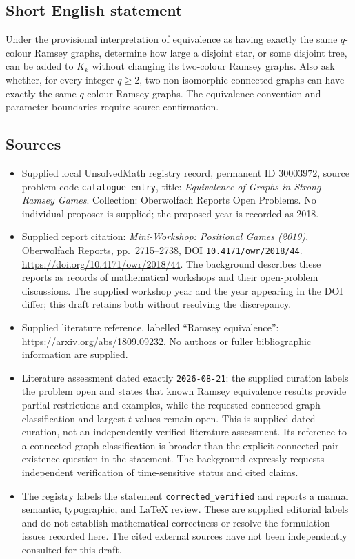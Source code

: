 \documentclass[11pt]{article}
\begin{document}
\subsection{Short English statement}
Under the provisional interpretation of equivalence as having exactly the same \(q\)-colour Ramsey graphs, determine how large a disjoint star, or some disjoint tree, can be added to \(K_k\) without changing its two-colour Ramsey graphs. Also ask whether, for every integer \(q\ge2\), two non-isomorphic connected graphs can have exactly the same \(q\)-colour Ramsey graphs. The equivalence convention and parameter boundaries require source confirmation.
\subsection{Sources}
\begin{itemize}
\item Supplied local UnsolvedMath registry record, permanent ID \(30003972\), source problem code \texttt{catalogue entry}, title: \emph{Equivalence of Graphs in Strong Ramsey Games}. Collection: Oberwolfach Reports Open Problems. No individual proposer is supplied; the proposed year is recorded as 2018.
\item Supplied report citation: \emph{Mini-Workshop: Positional Games (2019)}, Oberwolfach Reports, pp.\ 2715--2738, DOI \texttt{10.4171/owr/2018/44}. \url{https://doi.org/10.4171/owr/2018/44}. The background describes these reports as records of mathematical workshops and their open-problem discussions. The supplied workshop year and the year appearing in the DOI differ; this draft retains both without resolving the discrepancy.
\item Supplied literature reference, labelled ``Ramsey equivalence'': \url{https://arxiv.org/abs/1809.09232}. No authors or fuller bibliographic information are supplied.
\item Literature assessment dated exactly \texttt{2026-08-21}: the supplied curation labels the problem open and states that known Ramsey equivalence results provide partial restrictions and examples, while the requested connected graph classification and largest \(t\) values remain open. This is supplied dated curation, not an independently verified literature assessment. Its reference to a connected graph classification is broader than the explicit connected-pair existence question in the statement. The background expressly requests independent verification of time-sensitive status and cited claims.
\item The registry labels the statement \texttt{corrected\_verified} and reports a manual semantic, typographic, and LaTeX review. These are supplied editorial labels and do not establish mathematical correctness or resolve the formulation issues recorded here. The cited external sources have not been independently consulted for this draft.
\end{itemize}
\end{document}

